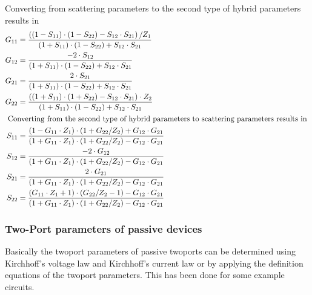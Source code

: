Converting from scattering parameters to the second type of hybrid
parameters results in
\begin{align}
G_{11} &= \dfrac{\left(\left(1 - S_{11}\right)\cdot \left(1 - S_{22}\right) - S_{12}\cdot S_{21}\right) / Z_{1}}{\left(1 + S_{11}\right)\cdot \left(1 - S_{22}\right) + S_{12}\cdot S_{21}}\\
G_{12} &= \dfrac{-2\cdot S_{12}}{\left(1 + S_{11}\right)\cdot \left(1 - S_{22}\right) + S_{12}\cdot S_{21}}\\
G_{21} &= \dfrac{2\cdot S_{21}}{\left(1 + S_{11}\right)\cdot \left(1 - S_{22}\right) + S_{12}\cdot S_{21}}\\
G_{22} &= \dfrac{\left(\left(1 + S_{11}\right)\cdot \left(1 + S_{22}\right) - S_{12}\cdot S_{21}\right)\cdot Z_{2}}{\left(1 + S_{11}\right)\cdot \left(1 - S_{22}\right) + S_{12}\cdot S_{21}}\\
\intertext{
Converting from the second type of hybrid parameters to scattering
parameters results in
}
S_{11} &= \dfrac{\left(1 - G_{11}\cdot Z_{1}\right)\cdot \left(1 + G_{22} / Z_{2}\right) + G_{12}\cdot G_{21}}{\left(1 + G_{11}\cdot Z_{1}\right)\cdot \left(1 + G_{22} / Z_{2}\right) - G_{12}\cdot G_{21}}\\
S_{12} &= \dfrac{-2\cdot G_{12}}{\left(1 + G_{11} \cdot Z_{1}\right)\cdot \left(1 + G_{22} / Z_{2}\right) - G_{12}\cdot G_{21}}\\
S_{21} &= \dfrac{2\cdot G_{21}}{\left(1 + G_{11} \cdot Z_{1}\right)\cdot \left(1 + G_{22} / Z_{2}\right) - G_{12}\cdot G_{21}}\\
S_{22} &= \dfrac{\left(G_{11} \cdot Z_{1} + 1\right)\cdot \left(G_{22} / Z_{2} - 1\right) - G_{12}\cdot G_{21}}{\left(1 + G_{11} \cdot Z_{1}\right)\cdot \left(1 + G_{22} / Z_{2}\right) - G_{12}\cdot G_{21}}
\end{align}

\subsubsection{Two-Port parameters of passive devices}

Basically the twoport parameters of passive twoports can be determined
using Kirchhoff's voltage law and Kirchhoff's current law or by
applying the definition equations of the twoport parameters.  This has
been done \cite{Weissgerber} for some example circuits.

